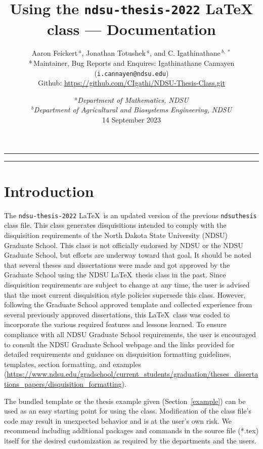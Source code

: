 \documentclass[letterpaper]{refart}
\title{Using the \texttt{ndsu-thesis-2022} \LaTeX\/ class --- Documentation}
\author{Aaron Feickert$\,^{a}$, Jonathan Totushek$\,^{a}$, and C. Igathinathane$\,^{b,\,*}$ \\ *\,Maintainer, Bug Reports and Enquires:  Igathinathane Cannayen (\texttt{i.cannayen@ndsu.edu})\\ {\small Github: \url{https://github.com/CIgathi/NDSU-Thesis-Class.git}}
}
\date{{\small $^{a}$\emph{Department of Mathematics, NDSU} \\ $^{b}$\emph{Department of Agricultural and Biosystems Engineering, NDSU}\\[2ex]}
14 September 2023}
\newcommand\ix[1]{#1\index{#1}} %
\begin{document}
\maketitle

\hrule

\begin{fullpage}
\begin{multicols}{2}
\tableofcontents
\nopagebreak
\end{multicols}
\hrule
\end{fullpage}

\section{Introduction}
The \texttt{ndsu-thesis-2022} \LaTeX\ is an updated version of the previous \texttt{ndsu\-thesis} \ix{class} file. This class generates disquisitions intended to comply with the disquisition requirements of the North Dakota State University (NDSU) Graduate School. This class is not officially endorsed by NDSU or the NDSU Graduate School, but efforts are underway toward that goal. It should be noted that several theses and dissertations were made and got approved by the Graduate School using the NDSU \LaTeX\ thesis class in the past. Since disquisition requirements are subject to change at any time, the user is advised that the most current disquisition style policies supersede this class. However, following the Graduate School approved template and collected experience from several previously approved dissertations, this \LaTeX\ class was coded to incorporate the various required features and lessons learned. To ensure compliance with all NDSU Graduate School requirements, the user is encouraged to consult the NDSU Graduate School webpage and the links provided for detailed requirements and guidance on disquisition formatting guidelines, templates, section formatting, and examples (\url{https://www.ndsu.edu/gradschool/current_students/graduation/theses_dissertations_papers/disquisition_formatting}). 


The bundled \ix{template} or the thesis example given (Section~\ref{example}) can be used as an easy starting point for using the class. Modification of the class file's code may result in unexpected behavior and is at the user's own risk. We recommend including additional packages and commands in the source file (*.tex) itself for the desired customization as required by the departments and the users. 
\end{document}
